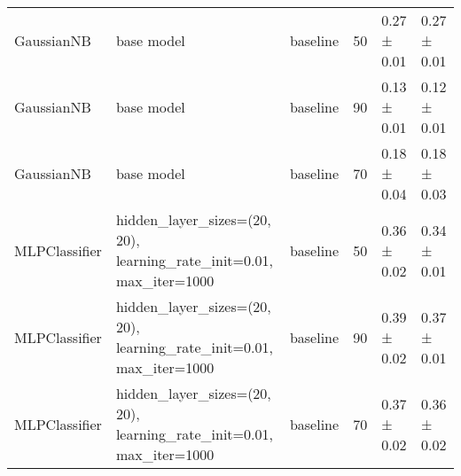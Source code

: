 \begin{tabular}{lllrll}
    GaussianNB             & base model                                                                            & baseline               & 50                     & 0.27 ± 0.01             & 0.27 ± 0.01                  \\
    GaussianNB             & base model                                                                            & baseline               & 90                     & 0.13 ± 0.01             & 0.12 ± 0.01                  \\
    GaussianNB             & base model                                                                            & baseline               & 70                     & 0.18 ± 0.04             & 0.18 ± 0.03                  \\
    MLPClassifier          & hidden\_layer\_sizes=(20, 20), learning\_rate\_init=0.01,              max\_iter=1000 & baseline               & 50                     & 0.36 ± 0.02             & 0.34 ± 0.01                  \\
    MLPClassifier          & hidden\_layer\_sizes=(20, 20), learning\_rate\_init=0.01,              max\_iter=1000 & baseline               & 90                     & 0.39 ± 0.02             & 0.37 ± 0.01                  \\
    MLPClassifier          & hidden\_layer\_sizes=(20, 20), learning\_rate\_init=0.01,              max\_iter=1000 & baseline               & 70                     & 0.37 ± 0.02             & 0.36 ± 0.02                  \\
    \bottomrule
\end{tabular}
